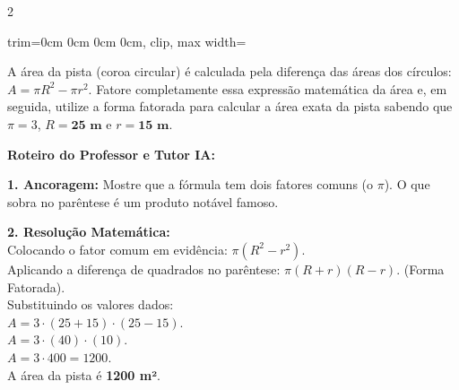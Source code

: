 \begin{multicols*}{2}
\begin{enunciadoLiteral}
\begin{center}
\begin{adjustbox}{trim=0cm 0cm 0cm 0cm, clip, max width=\larguraTikz}
\end{adjustbox}
\end{center}

A área da pista (coroa circular) é calculada pela diferença das áreas dos círculos: $A = \pi R^2 - \pi r^2$.
Fatore completamente essa expressão matemática da área e, em seguida, utilize a forma fatorada para calcular a área exata da pista sabendo que $\pi = 3$, $R = \textbf{25 m}$ e $r = \textbf{15 m}$.
\end{enunciadoLiteral}

\ifgabarito
    \begin{tcolorbox}[colback=CorTitUm!5, colframe=CorTitUm, boxrule=1pt, arc=4pt, left=6pt, right=6pt, top=6pt, bottom=6pt]
    \small\textbf{\textcolor{CorTitUm}{Roteiro do Professor e Tutor IA:}}\par\vspace{0.1cm}
    \color{CinzaEscuro}
    \textbf{1. Ancoragem:} Mostre que a fórmula tem dois fatores comuns (o $\pi$). O que sobra no parêntese é um produto notável famoso.\par\vspace{0.1cm}
    \textbf{2. Resolução Matemática:}\\
    Colocando o fator comum em evidência: $\pi(R^2 - r^2)$.\\
    Aplicando a diferença de quadrados no parêntese: $\pi(R + r)(R - r)$. (Forma Fatorada).\\
    Substituindo os valores dados:\\
    $A = 3 \cdot (25 + 15) \cdot (25 - 15)$.\\
    $A = 3 \cdot (40) \cdot (10)$.\\
    $A = 3 \cdot 400 = 1200$.\\
    A área da pista é \textbf{1200 m²}.
    \end{tcolorbox}
    \vspace{0.15cm}
    

\end{multicols*}
